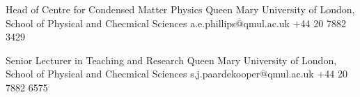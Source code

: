 %
%
%


\begin{referees}
    {Head of Centre for Condensed Matter Physics}
    {Queen Mary University of London, School of Physical and Checmical Sciences}
    {a.e.phillips@qmul.ac.uk}
    {+44 20 7882 3429}
    
            {Senior Lecturer in Teaching and Research}
            {Queen Mary University of London, School of Physical and Checmical Sciences}
            {s.j.paardekooper@qmul.ac.uk}
            {+44 20 7882 6575}
            

\end{referees}